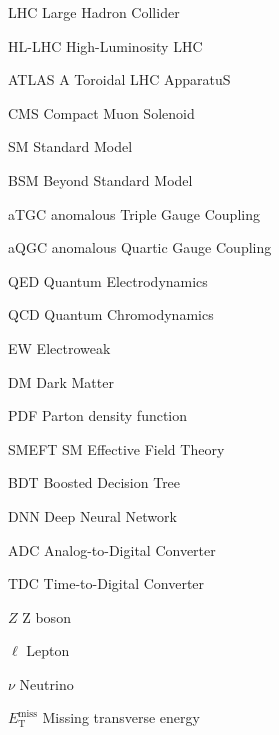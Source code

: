 
\begin{notation}

  \begin{notationlist}{2em}
    \item[LHC]               Large Hadron Collider
    \item[HL-LHC]            High-Luminosity LHC  
    \item[ATLAS]             A Toroidal LHC ApparatuS
    \item[CMS]               Compact Muon Solenoid
    \item[SM]                Standard Model
    \item[BSM]               Beyond Standard Model
    \item[aTGC]              anomalous Triple Gauge Coupling
    \item[aQGC]              anomalous Quartic Gauge Coupling
    \item[QED]               Quantum Electrodynamics
    \item[QCD]               Quantum Chromodynamics
    \item[EW]                Electroweak 
    \item[DM]                Dark Matter 
    \item[PDF]               Parton density function
    \item[SMEFT]             SM Effective Field Theory
    \item[BDT]               Boosted Decision Tree
    \item[DNN]               Deep Neural Network    
    \item[ADC]               Analog-to-Digital Converter
    \item[TDC]               Time-to-Digital Converter
    \item[$Z$]               Z boson
    \item[$\ell$]            Lepton
    \item[$\nu$]             Neutrino
    \item[$E_{\mathrm{T}}^{\mathrm{miss}}$] Missing transverse energy
  \end{notationlist}

\end{notation}






